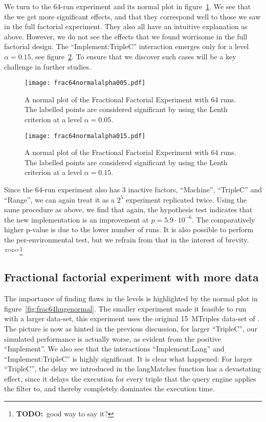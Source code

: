 \documentclass{article}
\newcommand{\todo}[1]{\ensuremath{^{\textrm{\tiny{TODO}\normalsize}}}\footnote{\textbf{TODO:}~#1}}
\begin{document}
We turn to the 64-run experiment and its normal plot in
figure~\ref{fig:frac64normalalpha005}. We see that the we get more significant
effects, and that they correspond well to those we saw in the full
factorial experiment. They also all have an intuitive
explanation as above. However, we do not see the effects that we found
worrisome in the full factorial design. The ``Implement:TripleC''
interaction emerges only for a level $\alpha=0.15$, see
figure~\ref{fig:frac64normalalpha015}. To ensure that we discover such
cases will be a key challenge in further studies.

\begin{figure}[ht]
  \texttt{[image: frac64normalalpha005.pdf]}
  \caption{A normal plot of the Fractional Factorial Experiment with
    64 runs. The labelled points are considered significant by using
    the Lenth criterion at a level
    $\alpha=0.05$.}\label{fig:frac64normalalpha005}
\end{figure}
\begin{figure}[hb]
  \texttt{[image: frac64normalalpha015.pdf]}
  \caption{A normal plot of the Fractional Factorial Experiment with
    64 runs. The labelled points are considered significant by using
    the Lenth criterion at a level
    $\alpha=0.15$.}\label{fig:frac64normalalpha015}
\end{figure}

Since the 64-run experiment also has 3 inactive factors, ``Machine'',
``TripleC'' and ``Range'', we can again treat it as a $2^5$ experiment
replicated twice. Using the same procedure as above, we find that
again, the hypothesis test indicates that the new implementation is an
improvement at $p = 5.9 \cdot 10^{-6}$. The comparatively higher p-value
is due to the lower number of runs. It is also possible to perform the
per-environmental test, but we refrain from that in the interest of
brevity.\todo{good way to say it?}


\subsection{Fractional factorial experiment with more data}

The importance of finding flaws in the levels is highlighted by the
normal plot in figure~\ref{fig:frac64hugenormal}. The smaller
experiment made it feasible to run with a larger data-set, this
experiment uses the original 15~MTriples data-set of
\cite{mxro:Morsey2011DBpedia}. The picture is now as hinted in the
previous discussion, for larger ``TripleC'', our simulated performance
is actually worse, as evident from the positive ``Implement''. We also
see that the interactions ``Implement:Lang'' and ``Implement:TripleC''
is highly significant. It is clear what happened: For larger
``TripleC'', the delay we introduced in the langMatches function has a
devastating effect, since it delays the execution for every triple
that the query engine applies the filter to, and thereby completely
dominates the execution time.
\end{document}
